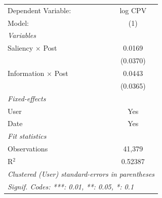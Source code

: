 \begin{tabular}{lc}
   \tabularnewline \midrule \midrule
   Dependent Variable:        & log CPV\\  
   Model:                     & (1)\\  
   \midrule
   \emph{Variables}\\
   Saliency $\times$ Post     & 0.0169\\   
                              & (0.0370)\\   
   Information $\times$ Post  & 0.0443\\   
                              & (0.0365)\\   
   \midrule
   \emph{Fixed-effects}\\
   User                       & Yes\\  
   Date                       & Yes\\  
   \midrule
   \emph{Fit statistics}\\
   Observations               & 41,379\\  
   R$^2$                      & 0.52387\\  
   \midrule \midrule
   \multicolumn{2}{l}{\emph{Clustered (User) standard-errors in parentheses}}\\
   \multicolumn{2}{l}{\emph{Signif. Codes: ***: 0.01, **: 0.05, *: 0.1}}\\
\end{tabular}
